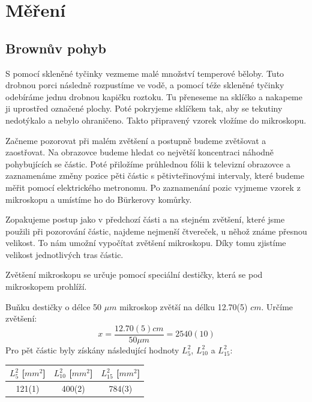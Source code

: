 \documentclass[a4paper,11pt]{article}
\begin{document}
    \begin{minipage}[t]{0.5\textwidth} 
    \section{Měření}  
        \subsection{Brownův pohyb}
        S pomocí skleněné tyčinky vezmeme malé množství temperové běloby. Tuto drobnou porci následně rozpustíme ve vodě, a pomocí téže skleněné tyčinky odebíráme jednu drobnou kapičku roztoku. Tu přeneseme na sklíčko a nakapeme ji uprostřed označené plochy. Poté pokryjeme sklíčkem tak, aby se tekutiny nedotýkalo a nebylo ohraničeno. Takto připravený vzorek vložíme do mikroskopu. 
        \par Začneme pozorovat při malém zvětšení a postupně budeme zvětšovat a zaostřovat. Na obrazovce budeme hledat co největší koncentraci náhodně pohybujících se částic. Poté přiložíme průhlednou fólii k televizní obrazovce a zaznamenáme změny pozice pěti částic s pětivteřinovými intervaly, které budeme měřit pomocí elektrického metronomu. Po zaznamenání pozic vyjmeme vzorek z mikroskopu a umístíme ho do Bürkerovy komůrky. 
        \par Zopakujeme postup jako v předchozí části a na stejném zvětšení, které jsme použili při pozorování částic, najdeme nejmenší čtvereček, u něhož známe přesnou velikost. To nám umožní vypočítat zvětšení mikroskopu. Díky tomu zjistíme velikost jednotlivých tras částic.
        \par Zvětšení mikroskopu se určuje pomocí speciální destičky, která se pod mikroskopem prohlíží. 
        \par Buňku destičky o délce 50 $\mu m$ mikroskop zvětší na délku 12.70(5) $cm$. Určíme zvětšení: 
        \begin{equation}
            x = \frac{12.70(5) cm}{50 \mu m} = 2540(10)
        \end{equation}
        Pro pět částic byly získány následující hodnoty $L_5^2$, $L_{10}^2$ a $L_{15}^2$: 
        \vspace{15pt}
        \par \centering
        \begin{tabular}{|c|c|c|}
            \hline
            $L_5^2$ [$mm^2$] & $L_{10}^2$ [$mm^2$] & $L_{15}^2$ [$mm^2$] \\
            \hline
            121(1) & 400(2) & 784(3) \\

\end{tabular}
\end{minipage}
\end{document}
